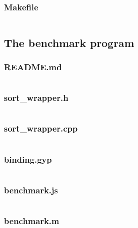 \documentclass{article}
\begin{document}
\subsubsection{Makefile}
\inputminted{makefile}{../answer/Makefile}


\subsection{The benchmark program}
\subsubsection{README.md}
\inputminted{md}{../benchmark/README.md}
\subsubsection{sort\_wrapper.h}
\inputminted{c++}{../benchmark/selection_wrapper.h}
\subsubsection{sort\_wrapper.cpp}
\inputminted{c++}{../benchmark/selection_wrapper.cpp}
\subsubsection{binding.gyp}
\inputminted{json}{../benchmark/binding.gyp}
\subsubsection{benchmark.js}
\inputminted{javascript}{../benchmark/benchmark.js}
\subsubsection{benchmark.m}
\inputminted{matlab}{../benchmark/benchmark.m}
\end{document}
